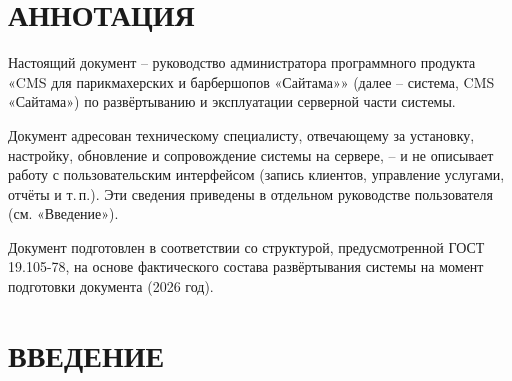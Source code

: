 




\setcounter{page}{2}

\section*{\hspace*{\gostindent}АННОТАЦИЯ}

Настоящий документ -- руководство администратора программного продукта
«CMS для парикмахерских и барбершопов «Сайтама»» (далее -- система, CMS
«Сайтама») по развёртыванию и эксплуатации серверной части системы.

Документ адресован техническому специалисту, отвечающему за установку,
настройку, обновление и сопровождение системы на сервере, -- и не
описывает работу с пользовательским интерфейсом (запись клиентов,
управление услугами, отчёты и т.\,п.). Эти сведения приведены в отдельном
руководстве пользователя (см. «Введение»).

Документ подготовлен в соответствии со структурой, предусмотренной
ГОСТ 19.105-78, на основе фактического состава развёртывания системы на
момент подготовки документа (2026 год).

\newpage
\renewcommand{\contentsname}{СОДЕРЖАНИЕ}
\begingroup
\titleformat{\section}{\bfseries\centering}{\thesection}{0.5em}{}
\tableofcontents
\endgroup
\newpage

\section*{\hspace*{\gostindent}ВВЕДЕНИЕ}

